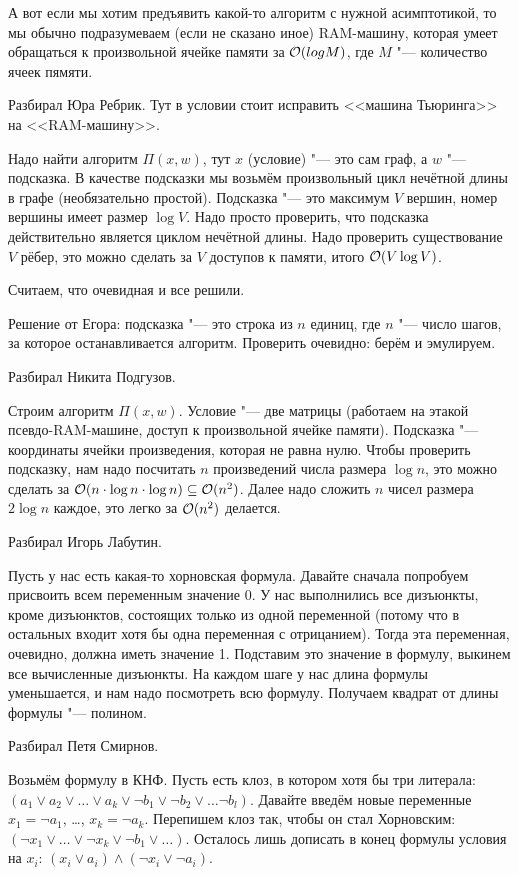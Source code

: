 	А вот если мы хотим предъявить какой-то алгоритм с нужной асимптотикой, то мы обычно
	подразумеваем (если не сказано иное) RAM-машину, которая умеет обращаться к произвольной
	ячейке памяти за $\mathcal O(log M)$, где $M$ "--- количество ячеек пямяти.

	Разбирал Юра Ребрик.
	Тут в условии стоит исправить <<машина Тьюринга>> на <<RAM-машину>>.

	Надо найти алгоритм $\Pi(x, w)$, тут $x$ (условие) "--- это сам граф, а $w$ "--- подсказка.
	В качестве подсказки мы возьмём произвольный цикл нечётной длины в графе (необязательно простой).
	Подсказка "--- это максимум $V$ вершин, номер вершины имеет размер $\log V$.
	Надо просто проверить, что подсказка действительно является циклом нечётной длины.
	Надо проверить существование $V$ рёбер, это можно сделать за $V$ доступов к памяти, итого $\mathcal O(V \log V)$.

	Считаем, что очевидная и все решили.

	Решение от Егора: подсказка "--- это строка из $n$ единиц, где $n$ "--- число
	шагов, за которое останавливается алгоритм.
	Проверить очевидно: берём и эмулируем.
	
	Разбирал Никита Подгузов.

	Строим алгоритм $\Pi(x, w)$.
	Условие "--- две матрицы (работаем на этакой псевдо-RAM-машине, доступ к произвольной ячейке памяти).
	Подсказка "--- координаты ячейки произведения, которая не равна нулю.
	Чтобы проверить подсказку, нам надо посчитать $n$ произведений числа размера $\log n$,
	это можно сделать за $\mathcal O(n\cdot\log n \cdot \log n) \subseteq \mathcal O(n^2)$.
	Далее надо сложить $n$ чисел размера $2\log n$ каждое, это легко за $\mathcal O(n^2)$ делается.

	Разбирал Игорь Лабутин.

	Пусть у нас есть какая-то хорновская формула.
	Давайте сначала попробуем присвоить всем переменным значение 0.
	У нас выполнились все дизъюнкты, кроме дизъюнктов, состоящих только из
	одной переменной (потому что в остальных входит хотя бы одна переменная с отрицанием).
	Тогда эта переменная, очевидно, должна иметь значение 1.
	Подставим это значение в формулу, выкинем все вычисленные дизъюнкты.
	На каждом шаге у нас длина формулы уменьшается, и нам надо посмотреть всю формулу.
	Получаем квадрат от длины формулы "--- полином.

	Разбирал Петя Смирнов.

	Возьмём формулу в КНФ.
	Пусть есть клоз, в котором хотя бы три литерала: $(a_1 \lor a_2 \lor \dots \lor a_k \lor \lnot b_1 \lor \lnot b_2 \lor \dots \lnot b_l)$.
	Давайте введём новые переменные $x_1 = \lnot a_1$, \dots, $x_k = \lnot a_k$.
	Перепишем клоз так, чтобы он стал Хорновским: $(\lnot x_1 \lor \ldots \lor \lnot x_k \lor \lnot b_1 \lor \dots)$.
	Осталось лишь дописать в конец формулы условия на $x_i$: $(x_i \lor a_i) \land (\lnot x_i \lor \lnot a_i)$.

